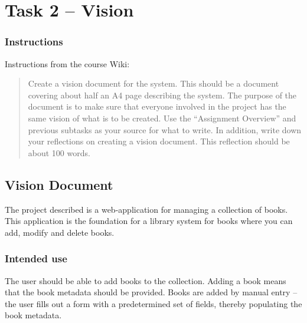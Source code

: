 %
%
%
%


\section{Task 2 -- Vision}\label{task-2-vision}

\subsubsection{Instructions}\label{task-2-instructions}
Instructions from the course Wiki\cite{1dv600:lab1:instructions}:

\begin{quote}
  Create a vision document for the system. This should be a document covering
  about half an A4 page describing the system. The purpose of the document is
  to make sure that everyone involved in the project has the same vision of
  what is to be created. Use the ``Assignment Overview'' and previous subtasks
  as your source for what to write. In addition, write down your reflections on
  creating a vision document. This reflection should be about 100 words.
\end{quote}


\subsection{Vision Document}\label{task-2-vision}
The project described is a web-application for managing a collection of books.
This application is the foundation for a library system for books where you can
add, modify and delete books.


\subsubsection{Intended use}
The user should be able to add books to the collection.
Adding a book means that the book metadata should be provided.
Books are added by manual entry -- the user fills out a form with a
predetermined set of fields, thereby populating the book metadata.

